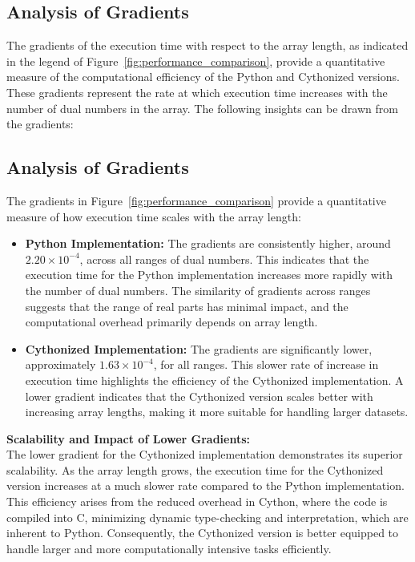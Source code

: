 \documentclass[a4paper,12pt]{article}
\begin{document}
\subsection{Analysis of Gradients}
The gradients of the execution time with respect to the array length, as indicated in the legend of Figure~\ref{fig:performance_comparison}, provide a quantitative measure of the computational efficiency of the Python and Cythonized versions. These gradients represent the rate at which execution time increases with the number of dual numbers in the array. The following insights can be drawn from the gradients:

\subsection{Analysis of Gradients}
The gradients in Figure~\ref{fig:performance_comparison} provide a quantitative measure of how execution time scales with the array length:

\begin{itemize}
    \item \textbf{Python Implementation:} The gradients are consistently higher, around \(2.20 \times 10^{-4}\), across all ranges of dual numbers. This indicates that the execution time for the Python implementation increases more rapidly with the number of dual numbers. The similarity of gradients across ranges suggests that the range of real parts has minimal impact, and the computational overhead primarily depends on array length.
    
    \item \textbf{Cythonized Implementation:} The gradients are significantly lower, approximately \(1.63 \times 10^{-4}\), for all ranges. This slower rate of increase in execution time highlights the efficiency of the Cythonized implementation. A lower gradient indicates that the Cythonized version scales better with increasing array lengths, making it more suitable for handling larger datasets.
\end{itemize}

\textbf{Scalability and Impact of Lower Gradients:} \\
The lower gradient for the Cythonized implementation demonstrates its superior scalability. As the array length grows, the execution time for the Cythonized version increases at a much slower rate compared to the Python implementation. This efficiency arises from the reduced overhead in Cython, where the code is compiled into C, minimizing dynamic type-checking and interpretation, which are inherent to Python. Consequently, the Cythonized version is better equipped to handle larger and more computationally intensive tasks efficiently.
\end{document}
